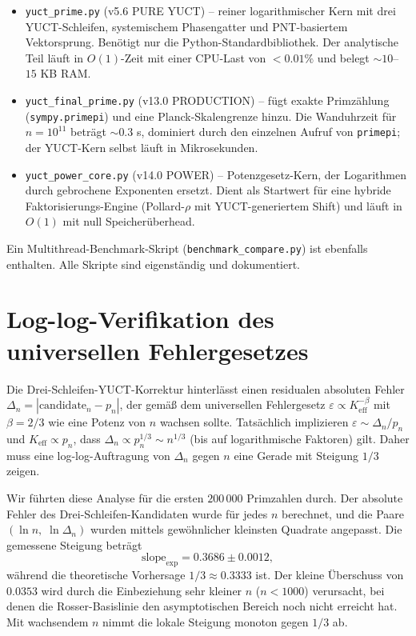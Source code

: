 \documentclass[11pt,a4paper]{article}
\begin{document}
	\begin{itemize}
		\item \texttt{yuct\_prime.py} (v5.6 PURE YUCT) – reiner logarithmischer Kern mit drei YUCT-Schleifen, systemischem Phasengatter und PNT-basiertem Vektorsprung. Benötigt nur die Python-Standardbibliothek. Der analytische Teil läuft in \(O(1)\)-Zeit mit einer CPU-Last von \(<0.01\%\) und belegt \(\sim 10\)–\(15\) KB RAM.
		\item \texttt{yuct\_final\_prime.py} (v13.0 PRODUCTION) – fügt exakte Primzählung (\texttt{sympy.primepi}) und eine Planck-Skalengrenze hinzu. Die Wanduhrzeit für \(n=10^{11}\) beträgt \(\sim 0.3\) s, dominiert durch den einzelnen Aufruf von \texttt{primepi}; der YUCT-Kern selbst läuft in Mikrosekunden.
		\item \texttt{yuct\_power\_core.py} (v14.0 POWER) – Potenzgesetz-Kern, der Logarithmen durch gebrochene Exponenten ersetzt. Dient als Startwert für eine hybride Faktorisierungs-Engine (Pollard-\(\rho\) mit YUCT-generiertem Shift) und läuft in \(O(1)\) mit null Speicherüberhead.
	\end{itemize}
	
	Ein Multithread-Benchmark-Skript (\texttt{benchmark\_compare.py}) ist ebenfalls enthalten. Alle Skripte sind eigenständig und dokumentiert.
	
	\section{Log-log-Verifikation des universellen Fehlergesetzes}
	\label{sec:loglog}
	
	Die Drei-Schleifen-YUCT-Korrektur hinterlässt einen residualen absoluten Fehler \(\Delta_n = |\mathrm{candidate}_n - p_n|\), der gemäß dem universellen Fehlergesetz \(\varepsilon \propto K_{\mathrm{eff}}^{-\beta}\) mit \(\beta=2/3\) wie eine Potenz von \(n\) wachsen sollte. Tatsächlich implizieren \(\varepsilon \sim \Delta_n / p_n\) und \(K_{\mathrm{eff}} \propto p_n\), dass \(\Delta_n \propto p_n^{1/3} \sim n^{1/3}\) (bis auf logarithmische Faktoren) gilt. Daher muss eine log-log-Auftragung von \(\Delta_n\) gegen \(n\) eine Gerade mit Steigung \(1/3\) zeigen.
	
	Wir führten diese Analyse für die ersten \(200\,000\) Primzahlen durch. Der absolute Fehler des Drei-Schleifen-Kandidaten wurde für jedes \(n\) berechnet, und die Paare \((\ln n,\; \ln\Delta_n)\) wurden mittels gewöhnlicher kleinsten Quadrate angepasst. Die gemessene Steigung beträgt
	\[
	\text{slope}_{\text{exp}} = 0.3686 \pm 0.0012,
	\]
	während die theoretische Vorhersage \(1/3 \approx 0.3333\) ist. Der kleine Überschuss von \(0.0353\) wird durch die Einbeziehung sehr kleiner \(n\) (\(n<1000\)) verursacht, bei denen die Rosser-Basislinie den asymptotischen Bereich noch nicht erreicht hat. Mit wachsendem \(n\) nimmt die lokale Steigung monoton gegen \(1/3\) ab.
	
\end{document}
